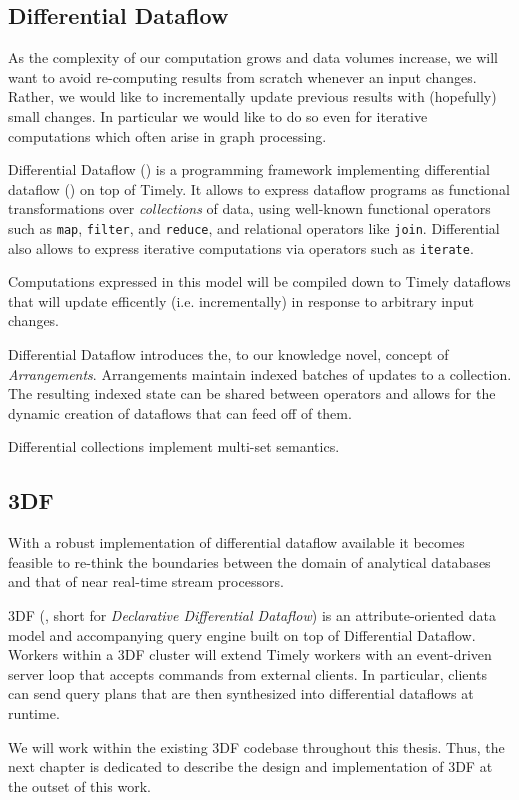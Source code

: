 \documentclass[../index.tex]{subfiles}
\begin{document}
\subsection{Differential Dataflow}

As the complexity of our computation grows and data volumes increase,
we will want to avoid re-computing results from scratch whenever an
input changes. Rather, we would like to incrementally update previous
results with (hopefully) small changes. In particular we would like to
do so even for iterative computations which often arise in graph
processing.

Differential Dataflow (\cite{differential}) is a programming framework
implementing differential dataflow (\cite{mcsherry2013differential})
on top of Timely. It allows to express dataflow programs as functional
transformations over \emph{collections} of data, using well-known
functional operators such as \texttt{map}, \texttt{filter}, and
\texttt{reduce}, and relational operators like
\texttt{join}. Differential also allows to express iterative
computations via operators such as \texttt{iterate}.

Computations expressed in this model will be compiled down to Timely
dataflows that will update efficently (i.e. incrementally) in response
to arbitrary input changes.

Differential Dataflow introduces the, to our knowledge novel, concept
of \emph{Arrangements}. Arrangements maintain indexed batches of
updates to a collection. The resulting indexed state can be shared
between operators and allows for the dynamic creation of dataflows
that can feed off of them.

Differential collections implement multi-set semantics.

\subsection{3DF}

With a robust implementation of differential dataflow available it
becomes feasible to re-think the boundaries between the domain of
analytical databases and that of near real-time stream processors.

3DF (\cite{declarative}, short for \emph{Declarative Differential
  Dataflow}) is an attribute-oriented data model and accompanying
query engine built on top of Differential Dataflow. Workers within a
3DF cluster will extend Timely workers with an event-driven server
loop that accepts commands from external clients. In particular,
clients can send query plans that are then synthesized into
differential dataflows at runtime.

We will work within the existing 3DF codebase throughout this
thesis. Thus, the next chapter is dedicated to describe the design and
implementation of 3DF at the outset of this work.
\end{document}
